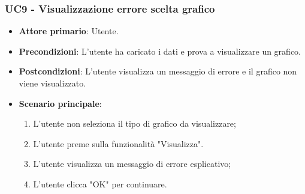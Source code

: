 \subsubsection{UC9 - Visualizzazione errore scelta grafico}
\begin{itemize}
	\item \textbf{Attore primario}: Utente.
	\item \textbf{Precondizioni}: L'utente ha caricato i dati e prova a visualizzare un grafico.
	\item \textbf{Postcondizioni}: L'utente visualizza un messaggio di errore e il grafico non viene visualizzato.
	\item \textbf{Scenario principale}:
		\begin{enumerate}
		\item L'utente non seleziona il tipo di grafico da visualizzare;
		\item L'utente preme sulla funzionalità "Visualizza".
			\item L'utente visualizza un messaggio di errore esplicativo;
			\item L'utente clicca "OK" per continuare.
		\end{enumerate}
\end{itemize}